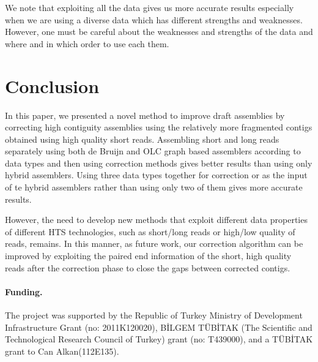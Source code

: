 \documentclass{llncs}
\begin{document}
We note that exploiting all the data gives us more accurate results especially when we are using a diverse data which has different strengths and weaknesses. However, one must be careful about the weaknesses and strengths of the data and where and in which order to use each them.
\section{Conclusion}
\label{concl}
In this paper, we presented a novel method to improve draft assemblies by correcting high contiguity assemblies using the relatively more fragmented contigs obtained using high quality short reads. Assembling short and long reads separately using both de Bruijn and OLC graph based assemblers according to data types and then using correction methods gives better results than using only hybrid assemblers. Using three data types together for correction or as the input of te hybrid assemblers rather than using only two of them gives more accurate results.

However, the need to develop new methods that exploit different data properties of different HTS technologies, such as short/long reads or high/low quality of reads, remains. In this manner, as future work, our correction algorithm can be improved by exploiting the paired end information of the short, high quality reads after the correction phase to close the gaps between corrected contigs.

\paragraph{Funding.}

The project was supported by the Republic of Turkey Ministry of Development Infrastructure Grant (no: 2011K120020), BİLGEM TÜBİTAK (The Scientific and Technological Research Council of Turkey) grant (no: T439000), and a TÜBİTAK grant to Can Alkan(112E135).\\
\end{document}

